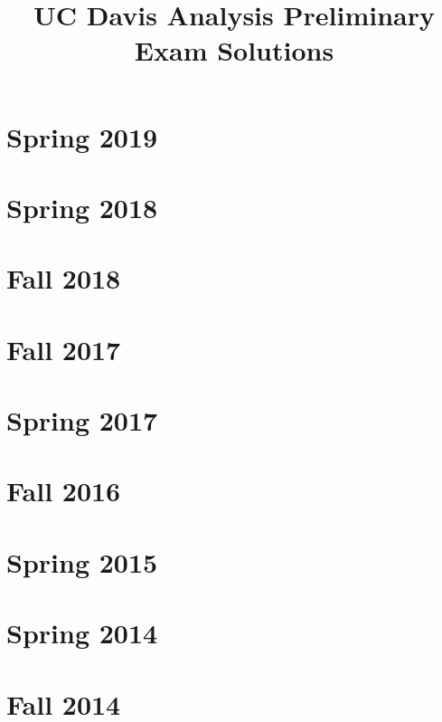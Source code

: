 \documentclass{book}
\title{UC Davis Analysis Preliminary Exam Solutions}
\begin{document}
\maketitle

\chapter{Spring 2019}



\chapter{Spring 2018}



\chapter{Fall 2018}


\chapter{Fall 2017}




\chapter{Spring 2017}


\chapter{Fall 2016}


\chapter{Spring 2015}



\chapter{Spring 2014}





\chapter{Fall 2014}

\end{document}
